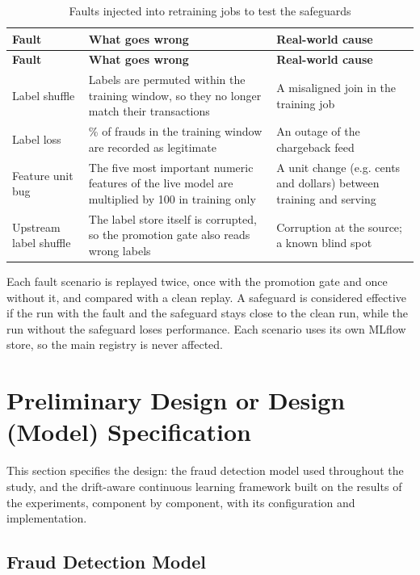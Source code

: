 {\footnotesize
\begin{longtable}{>{\raggedright\arraybackslash}p{}>{\raggedright\arraybackslash}p{}>{\raggedright\arraybackslash}p{}}
\caption{Faults injected into retraining jobs to test the safeguards}\label{tab:faults}\\
\toprule
\textbf{Fault} & \textbf{What goes wrong} & \textbf{Real-world cause} \\
\midrule
\endfirsthead
\toprule
\textbf{Fault} & \textbf{What goes wrong} & \textbf{Real-world cause} \\
\midrule
\endhead
Label shuffle & Labels are permuted within the training window, so they no longer match their transactions & A misaligned join in the training job \\ \midrule
Label loss & 80\% of frauds in the training window are recorded as legitimate & An outage of the chargeback feed \\ \midrule
Feature unit bug & The five most important numeric features of the live model are multiplied by 100 in training only & A unit change (e.g. cents and dollars) between training and serving \\ \midrule
Upstream label shuffle & The label store itself is corrupted, so the promotion gate also reads wrong labels & Corruption at the source; a known blind spot \\ \bottomrule
\end{longtable}
}

Each fault scenario is replayed twice, once with the promotion gate and once without it, and compared with a clean replay. A safeguard is considered effective if the run with the fault and the safeguard stays close to the clean run, while the run without the safeguard loses performance. Each scenario uses its own MLflow store, so the main registry is never affected.

\section{Preliminary Design or Design (Model) Specification}\label{sec:spec}

This section specifies the design: the fraud detection model used throughout the study, and the drift-aware continuous learning framework built on the results of the experiments, component by component, with its configuration and implementation.

\subsection{Fraud Detection Model}\label{sec:model}

